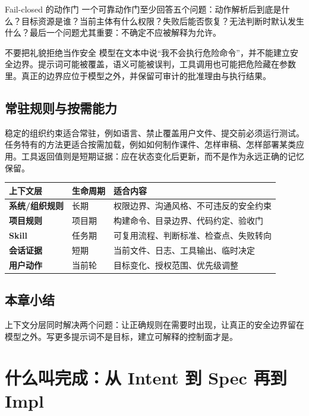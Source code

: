 \documentclass[a4paper,11pt]{article}
\begin{document}
\begin{knowledgebox}{Fail-closed 的动作门}
一个可靠动作门至少回答五个问题：动作解析后到底是什么？目标资源是谁？当前主体有什么权限？失败后能否恢复？无法判断时默认发生什么？最后一个问题尤其重要：不确定不应被解释为允许。
\end{knowledgebox}

\begin{warningbox}{不要把礼貌拒绝当作安全}
模型在文本中说“我不会执行危险命令”，并不能建立安全边界。提示词可能被覆盖，语义可能被误判，工具调用也可能把危险藏在参数里。真正的边界应位于模型之外，并保留可审计的批准理由与执行结果。
\end{warningbox}

\subsection{常驻规则与按需能力}

稳定的组织约束适合常驻，例如语言、禁止覆盖用户文件、提交前必须运行测试。任务特有的方法更适合按需加载，例如如何制作课件、怎样审稿、怎样部署某类应用。工具返回值则是短期证据：应在状态变化后更新，而不是作为永远正确的记忆保留。

\begin{center}
\small
\begin{tabularx}{\textwidth}{>{\bfseries}p{} p{} X}
\toprule
上下文层 & 生命周期 & 适合内容 \\
\midrule
系统/组织规则 & 长期 & 权限边界、沟通风格、不可违反的安全约束 \\
项目规则 & 项目期 & 构建命令、目录边界、代码约定、验收门 \\
Skill & 任务期 & 可复用流程、判断标准、检查点、失败转向 \\
会话证据 & 短期 & 当前文件、日志、工具输出、临时决定 \\
用户动作 & 当前轮 & 目标变化、授权范围、优先级调整 \\
\bottomrule
\end{tabularx}
\end{center}

\subsection{本章小结}

上下文分层同时解决两个问题：让正确规则在需要时出现，让真正的安全边界留在模型之外。写更多提示词不是目标，建立可解释的控制面才是。

\section{什么叫完成：从 Intent 到 Spec 再到 Impl}
\end{document}
